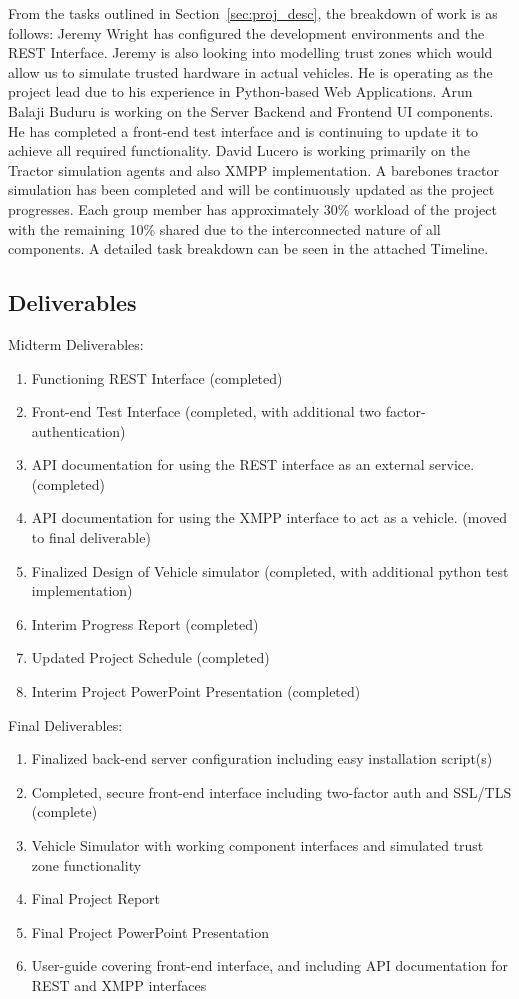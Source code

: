 \documentclass[conference,12pt]{IEEEtran}
\begin{document}
From the tasks outlined in Section~\ref{sec:proj_desc}, the breakdown of work is as follows:
Jeremy Wright has configured the development environments and the REST
Interface. Jeremy is also looking into modelling trust zones which would allow
us to simulate trusted hardware in actual vehicles.  He is operating as the
project lead due to his experience in Python-based Web Applications.  Arun
Balaji Buduru is working on the Server Backend and Frontend UI components. He
has completed a front-end test interface and is continuing to update it to
achieve all required functionality.  David Lucero is working primarily on the
Tractor simulation agents and also XMPP implementation. A barebones tractor
simulation has been completed and will be continuously updated as the project
progresses.  Each group member has approximately 30\% workload of the project
with the remaining 10\% shared due to the interconnected nature of all
components. A detailed task breakdown can be seen in the attached Timeline.

\subsection{Deliverables}

Midterm Deliverables:
\begin{enumerate}
\item Functioning REST Interface (completed)
\item Front-end Test Interface (completed, with additional two factor-authentication)
\item API documentation for using the REST interface as an external service. (completed)
\item API documentation for using the XMPP interface to act as a vehicle. (moved to final deliverable)
\item Finalized Design of Vehicle simulator (completed, with additional python test implementation)
\item Interim Progress Report (completed)
\item Updated Project Schedule (completed)
\item Interim Project PowerPoint Presentation (completed)
\end{enumerate}

Final Deliverables:
\begin{enumerate}
\item Finalized back-end server configuration including easy installation script(s)
\item Completed, secure front-end interface including two-factor auth and
    SSL/TLS (complete)
\item Vehicle Simulator with working component interfaces and simulated trust zone functionality
\item Final Project Report
\item Final Project PowerPoint Presentation
\item User-guide covering front-end interface, and including API documentation for REST and XMPP interfaces 
\end{enumerate}
\end{document}
